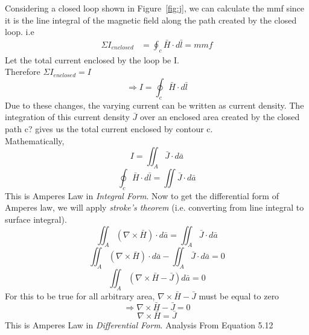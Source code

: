 Considering a closed loop shown in Figure~\ref{fig:j}, we can calculate the mmf since it is the line integral of the magnetic field along the path created by the closed loop. i.e
\begin{align*}
	\Sigma I_{enclosed} &= \oint_c\bar{H}\cdot d\bar{l} = mmf
\end{align*}
Let the total current enclosed by the loop be I.\\
Therefore $\Sigma I_{enclosed} = I$
\begin{equation*}
	\Rightarrow I = \oint_c\bar{H}\cdot d\bar{l}
\end{equation*}
Due to these changes, the varying current can be written as current density. The integration of this current density $\bar{J}$ over an enclosed area created by the closed path c? gives us the total current enclosed by contour c.\\
Mathematically,
\begin{equation*}
	I = \iint_A\bar{J} \cdot d\bar{a}
\end{equation*}
\begin{equation}
	\boxed{\oint_c\bar{H} \cdot d\bar{l} = \iint\bar{J} \cdot d\bar{a}}
\end{equation}
This is Amperes Law in \emph{Integral Form}. Now to get the differential form of Amperes law, we will apply \emph{stroke's theorem} (i.e. converting from line integral to surface integral).
\begin{equation*}
	\iint_A(\nabla \times \bar{H}) \cdot d\bar{a} = \iint_A\bar{J} \cdot d\bar{a}
\end{equation*}
\begin{equation*}
	\iint_A(\nabla \times \bar{H}) \cdot d\bar{a} - \iint_A\bar{J} \cdot d\bar{a} = 0
\end{equation*}
\begin{equation*}
	\iint_A(\nabla \times \bar{H} - \bar{J})d\bar{a} = 0
\end{equation*} 
For this to be true for all arbitrary area, $\nabla \times \bar{H} - \bar{J}$ must be equal to zero
\begin{equation*}
	\Rightarrow \nabla \times \bar{H} - \bar{J} = 0
\end{equation*}
\begin{equation}
	\boxed{\nabla \times \bar{H} = \bar{J}}
\end{equation}
This is Amperes Law in \emph{Differential Form}. Analysis From Equation 5.12
